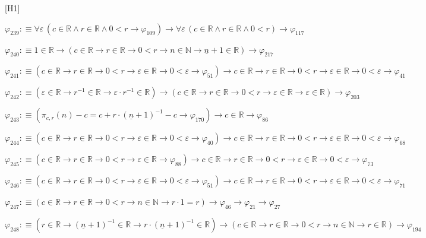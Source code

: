 \begin{fullproof}{[H1]}
\begin{abbrevlist}
\item $\varphi_{239} :\equiv \forall \varepsilon\,(c \in \mathbb{R} \land r \in \mathbb{R} \land 0 < r \to \varphi_{109}) \to \forall \varepsilon\,(c \in \mathbb{R} \land r \in \mathbb{R} \land 0 < r) \to \varphi_{117}$
\item $\varphi_{240} :\equiv 1 \in \mathbb{R} \to (c \in \mathbb{R} \to r \in \mathbb{R} \to 0 < r \to n \in \mathbb{N} \to \underline{n} + 1 \in \mathbb{R}) \to \varphi_{217}$
\item $\varphi_{241} :\equiv (c \in \mathbb{R} \to r \in \mathbb{R} \to 0 < r \to \varepsilon \in \mathbb{R} \to 0 < \varepsilon \to \varphi_{51}) \to c \in \mathbb{R} \to r \in \mathbb{R} \to 0 < r \to \varepsilon \in \mathbb{R} \to 0 < \varepsilon \to \varphi_{41}$
\item $\varphi_{242} :\equiv (\varepsilon \in \mathbb{R} \to r^{-1} \in \mathbb{R} \to \varepsilon \cdot r^{-1} \in \mathbb{R}) \to (c \in \mathbb{R} \to r \in \mathbb{R} \to 0 < r \to \varepsilon \in \mathbb{R} \to \varepsilon \in \mathbb{R}) \to \varphi_{203}$
\item $\varphi_{243} :\equiv (\pi_{c,r}(n) - c = c + r \cdot (\underline{n} + 1)^{-1} - c \to \varphi_{170}) \to c \in \mathbb{R} \to \varphi_{86}$
\item $\varphi_{244} :\equiv (c \in \mathbb{R} \to r \in \mathbb{R} \to 0 < r \to \varepsilon \in \mathbb{R} \to 0 < \varepsilon \to \varphi_{40}) \to c \in \mathbb{R} \to r \in \mathbb{R} \to 0 < r \to \varepsilon \in \mathbb{R} \to 0 < \varepsilon \to \varphi_{68}$
\item $\varphi_{245} :\equiv (c \in \mathbb{R} \to r \in \mathbb{R} \to 0 < r \to \varepsilon \in \mathbb{R} \to \varphi_{88}) \to c \in \mathbb{R} \to r \in \mathbb{R} \to 0 < r \to \varepsilon \in \mathbb{R} \to 0 < \varepsilon \to \varphi_{73}$
\item $\varphi_{246} :\equiv (c \in \mathbb{R} \to r \in \mathbb{R} \to 0 < r \to \varepsilon \in \mathbb{R} \to 0 < \varepsilon \to \varphi_{51}) \to c \in \mathbb{R} \to r \in \mathbb{R} \to 0 < r \to \varepsilon \in \mathbb{R} \to 0 < \varepsilon \to \varphi_{71}$
\item $\varphi_{247} :\equiv (c \in \mathbb{R} \to r \in \mathbb{R} \to 0 < r \to n \in \mathbb{N} \to r \cdot 1 = r) \to \varphi_{46} \to \varphi_{21} \to \varphi_{27}$
\item $\varphi_{248} :\equiv (r \in \mathbb{R} \to (\underline{n} + 1)^{-1} \in \mathbb{R} \to r \cdot (\underline{n} + 1)^{-1} \in \mathbb{R}) \to (c \in \mathbb{R} \to r \in \mathbb{R} \to 0 < r \to n \in \mathbb{N} \to r \in \mathbb{R}) \to \varphi_{194}$

\end{abbrevlist}
\end{fullproof}

